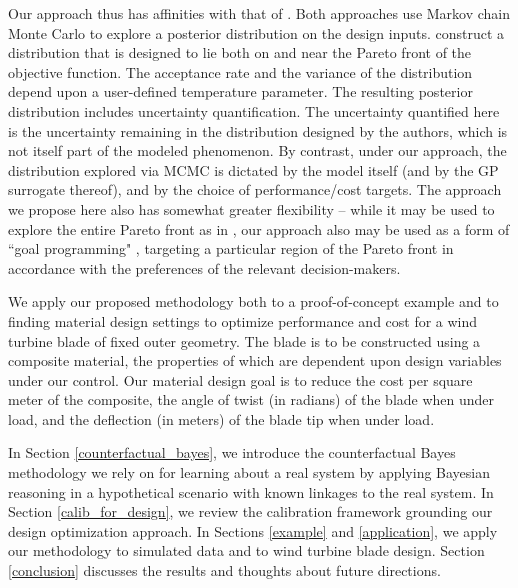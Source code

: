 \documentclass[12pt]{article}
\begin{document}
%
Our approach thus has affinities with that of \cite{Olalotiti-Lawal2015}.
%
Both approaches use Markov chain Monte Carlo \citep[MCMC;][]{Gelfand1990} to explore a posterior distribution on the design inputs.
%
\cite{Olalotiti-Lawal2015} construct a distribution that is designed to lie both on and near the Pareto front of the objective function.
%
The acceptance rate and the variance of the distribution depend upon a user-defined temperature parameter.
%
The resulting posterior distribution includes uncertainty quantification.
%
The uncertainty quantified here is the uncertainty remaining in the distribution designed by the authors, which is not itself part of the modeled phenomenon.
%
By contrast, under our approach, the distribution explored via MCMC is dictated by the model itself (and by the GP surrogate thereof), and by the choice of performance/cost targets.
%
The approach we propose here also has somewhat greater flexibility -- while it may be used to explore the entire Pareto front as in \cite{Olalotiti-Lawal2015}, our approach also may be used as a form of ``goal programming" \citep{Miettinen2008}, targeting a particular region of the Pareto front in accordance with the preferences of the relevant decision-makers.
%

%
We apply our proposed methodology both to a proof-of-concept example and to finding material design settings to optimize performance and cost for a wind turbine blade of fixed outer geometry.
%
The blade is to be constructed using a composite material, the properties of which are dependent upon design variables under our control.
%
%
Our material design goal is to reduce the cost per square meter of the composite, the angle of twist (in radians) of the blade when under load, and the deflection (in meters) of the blade tip when under load.
%

%
In Section \ref{counterfactual_bayes}, we introduce the counterfactual Bayes methodology we rely on for learning about a real system by applying Bayesian reasoning in a hypothetical scenario with known linkages to the real system.
%
In Section \ref{calib_for_design}, we review the calibration framework grounding our design optimization approach. 
%
In Sections \ref{example} and \ref{application}, we apply our methodology to simulated data and to wind turbine blade design.
%
%
Section \ref{conclusion} discusses the results and thoughts about future directions.
%
\end{document}
